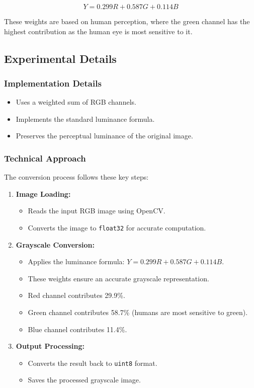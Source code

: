 \documentclass[12pt,a4paper]{article}
\begin{document}
\[
  Y = 0.299R + 0.587G + 0.114B
\]

These weights are based on human perception, where the green channel has the highest contribution as the human eye is most sensitive to it.

\subsection{Experimental Details}
\subsubsection{Implementation Details}
\begin{itemize}
  \item Uses a weighted sum of RGB channels.
  \item Implements the standard luminance formula.
  \item Preserves the perceptual luminance of the original image.
\end{itemize}

\subsubsection{Technical Approach}
The conversion process follows these key steps:

\begin{enumerate}
  \item \textbf{Image Loading:}
    \begin{itemize}
      \item Reads the input RGB image using OpenCV.
      \item Converts the image to \texttt{float32} for accurate computation.
    \end{itemize}

  \item \textbf{Grayscale Conversion:}
    \begin{itemize}
      \item Applies the luminance formula: \(Y = 0.299R + 0.587G + 0.114B\).
      \item These weights ensure an accurate grayscale representation.
      \item Red channel contributes 29.9\%.
      \item Green channel contributes 58.7\% (humans are most sensitive to green).
      \item Blue channel contributes 11.4\%.
    \end{itemize}

  \item \textbf{Output Processing:}
    \begin{itemize}
      \item Converts the result back to \texttt{uint8} format.
      \item Saves the processed grayscale image.
    \end{itemize}
\end{enumerate}
\end{document}
